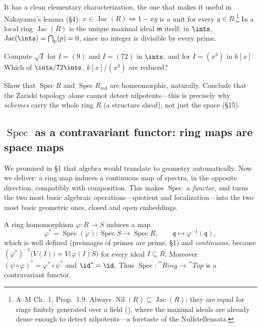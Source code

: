 \documentclass[11pt]{article}
\DeclareMathOperator{\Spec}{Spec}
\DeclareMathOperator{\Nil}{Nil}
\DeclareMathOperator{\Jac}{Jac}
\newcommand{\mfm}{\mathfrak{m}}
\newcommand{\mfq}{\mathfrak{q}}
\begin{document}
It has a clean elementary characterization, the one that makes it useful in Nakayama's lemma
(\S4): $x\in\Jac(R)\iff 1-xy$ is a unit for every $y\in R$.\footnote{A--M Ch.~1, Prop.\ 1.9.
Always $\Nil(R)\subseteq\Jac(R)$; they are equal for rings finitely generated over a field
(), where the maximal ideals are already dense enough to detect
nilpotents---a foretaste of the Nullstellensatz.} In a local ring $\Jac(R)$ is the unique
maximal ideal $\mfm$ itself; in $\ints$, $\Jac(\ints)=\bigcap_p (p)=0$, since no integer is
divisible by every prime.

\begin{xca}
Compute $\sqrt{I}$ for $I=(9)$ and $I=(72)$ in $\ints$, and for $I=(x^3)$ in $k[x]$. Which of
$\ints/72\ints$, $k[x]/(x^3)$ are reduced?
\end{xca}

\begin{xca}
Show that $\Spec R$ and $\Spec R_{\mathrm{red}}$ are homeomorphic, naturally. Conclude that the
Zariski topology alone cannot detect nilpotents---this is precisely why \emph{schemes} carry
the whole ring $R$ (a structure sheaf), not just the space (\S15).
\end{xca}

\subsection{\texorpdfstring{$\Spec$}{Spec} as a contravariant functor: ring maps are space maps}

We promised in \S1 that algebra would translate to geometry automatically. Now we deliver: a
ring map induces a continuous map of spectra, in the opposite direction, compatibly with
composition. This makes $\Spec$ a \emph{functor}, and turns the two most basic algebraic
operations---quotient and localization---into the two most basic geometric ones, closed and
open embeddings.

\begin{ttheorem}[$\Spec$ is a contravariant functor]
A ring homomorphism $\varphi\colon R\to S$ induces a map
\[
\varphi^\ast=\Spec(\varphi)\colon \Spec S\longrightarrow \Spec R,\qquad \mfq\longmapsto
\varphi^{-1}(\mfq),
\]
which is well defined (preimages of primes are prime, \S1) and \emph{continuous}, because
$(\varphi^\ast)^{-1}\big(V(I)\big)=V\big(\varphi(I)S\big)$ for every ideal $I\subseteq R$.
Moreover $(\psi\circ\varphi)^\ast=\varphi^\ast\circ\psi^\ast$ and $\id^\ast=\id$. Thus
$\Spec\colon\cat{Ring}\to\cat{Top}$ is a contravariant functor.
\end{ttheorem}
\end{document}
